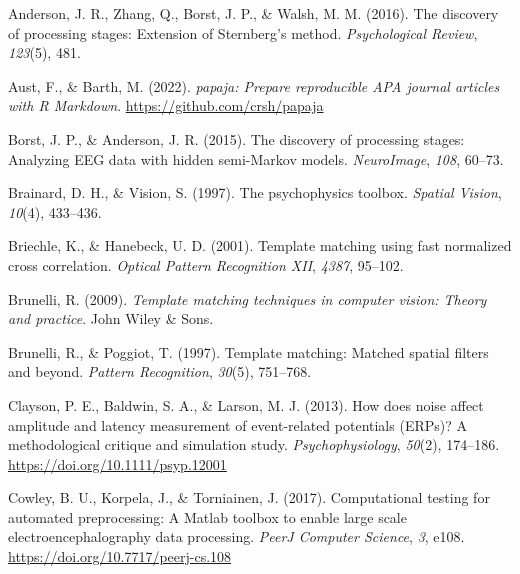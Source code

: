 \documentclass[
  man]{apa7}
\newlength{\cslhangindent}
\newlength{\cslentryspacingunit} %
\newenvironment{CSLReferences}[2] %
 {%
  \setlength{\parindent}{0pt}
  \ifodd #1
  \let\oldpar\par
  \def\par{\hangindent=\cslhangindent\oldpar}
  \fi
  \setlength{\parskip}{#2\cslentryspacingunit}
 }%
 {}
\begin{document}
\hypertarget{refs}{}
\begin{CSLReferences}{1}{0}
\leavevmode{}%
Anderson, J. R., Zhang, Q., Borst, J. P., \& Walsh, M. M. (2016). The discovery of processing stages: {Extension} of {Sternberg}'s method. \emph{Psychological Review}, \emph{123}(5), 481.

\leavevmode{}%
Aust, F., \& Barth, M. (2022). \emph{{papaja}: {Prepare} reproducible {APA} journal articles with {R Markdown}}. \url{https://github.com/crsh/papaja}

\leavevmode{}%
Borst, J. P., \& Anderson, J. R. (2015). The discovery of processing stages: {Analyzing} {EEG} data with hidden semi-{Markov} models. \emph{NeuroImage}, \emph{108}, 60--73.

\leavevmode{}%
Brainard, D. H., \& Vision, S. (1997). The psychophysics toolbox. \emph{Spatial Vision}, \emph{10}(4), 433--436.

\leavevmode{}%
Briechle, K., \& Hanebeck, U. D. (2001). Template matching using fast normalized cross correlation. \emph{Optical Pattern Recognition {XII}}, \emph{4387}, 95--102.

\leavevmode{}%
Brunelli, R. (2009). \emph{Template matching techniques in computer vision: Theory and practice}. John Wiley \& Sons.

\leavevmode{}%
Brunelli, R., \& Poggiot, T. (1997). Template matching: {Matched} spatial filters and beyond. \emph{Pattern Recognition}, \emph{30}(5), 751--768.

\leavevmode{}%
Clayson, P. E., Baldwin, S. A., \& Larson, M. J. (2013). How does noise affect amplitude and latency measurement of event-related potentials ({ERPs})? {A} methodological critique and simulation study. \emph{Psychophysiology}, \emph{50}(2), 174--186. \url{https://doi.org/10.1111/psyp.12001}

\leavevmode{}%
Cowley, B. U., Korpela, J., \& Torniainen, J. (2017). Computational testing for automated preprocessing: A {Matlab} toolbox to enable large scale electroencephalography data processing. \emph{PeerJ Computer Science}, \emph{3}, e108. \url{https://doi.org/10.7717/peerj-cs.108}


\end{CSLReferences}
\end{document}
